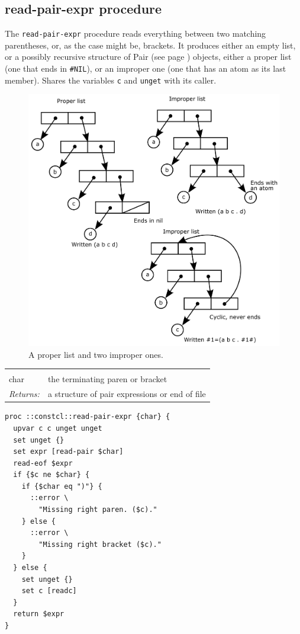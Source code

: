 \documentclass[twoside,9pt]{report}
\begin{document}
\subsection{read-pair-expr procedure}
\label{read-pair-expr-procedure}


The \texttt{read-pair-expr} procedure reads everything between two matching parentheses, or, as the case might be, brackets. It produces either an empty list, or a possibly recursive structure of Pair (see page \pageref{pairs-and-lists}) objects, either a proper list (one that ends in \texttt{\#NIL}), or an improper one (one that has an atom as its last member). Shares the variables \texttt{c} and \texttt{unget} with its caller.

\begin{figure}[h!]\includegraphics{images/prop-improp.png}\captionsetup{labelformat=empty}\caption{ A proper list and two improper ones.}\label{fig:-a-proper-list-and-two-improper-ones}\end{figure}
\noindent\begin{tabular}{ |p{1.9cm} p{8cm}| }
\hline
\rowcolor[HTML]{CCCCCC} \multicolumn{2}{|l|}{\bf read-pair-expr (internal)} \\
char & the terminating paren or bracket \\
\textit{Returns:} & a structure of pair expressions or end of file \\
\hline
\end{tabular}
\begin{lstlisting}
proc ::constcl::read-pair-expr {char} {
  upvar c c unget unget
  set unget {}
  set expr [read-pair $char]
  read-eof $expr
  if {$c ne $char} {
    if {$char eq ")"} {
      ::error \
        "Missing right paren. ($c)."
    } else {
      ::error \
        "Missing right bracket ($c)."
    }
  } else {
    set unget {}
    set c [readc]
  }
  return $expr
}
\end{lstlisting}
\end{document}
